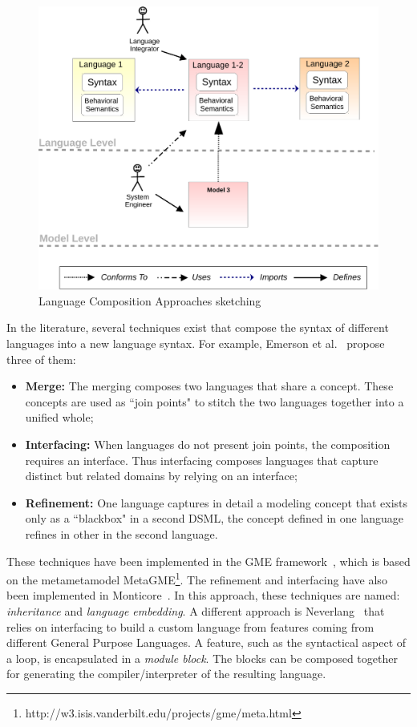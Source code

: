 \begin{figure}
	\begin{center}
		\includegraphics[width=.7\textwidth]{background/figs/langcompo}
		\caption{Language Composition Approaches sketching}
		\label{fig:langcompo}
	\end{center}
\end{figure}

In the literature, several techniques exist that compose the syntax of different languages into a new language syntax. For example, Emerson et al.~\cite{metamodelcompo} propose three of them:
\begin{itemize}
	\item \textbf{Merge:} The merging composes two languages that share a concept. These concepts are used as ``join points" to stitch the two languages together into a unified whole;
	\item \textbf{Interfacing:} When languages do not present join points, the composition requires an interface. Thus interfacing composes languages that capture distinct but related domains by relying on an interface;
	\item \textbf{Refinement:} One language captures in detail a modeling concept that exists only as a ``blackbox" in a second DSML, \ie the concept defined in one language refines in other in the second language.
\end{itemize}
These techniques have been implemented in the GME framework~\cite{metamodelcompo}, which is based on the metametamodel MetaGME\footnote{http://w3.isis.vanderbilt.edu/projects/gme/meta.html}. The refinement and interfacing have also been implemented in Monticore~\cite{monticore}. In this approach, these techniques are named: \emph{inheritance} and \emph{language embedding}. A different approach is Neverlang~\cite{neverlang} that relies on interfacing to build a custom language from features coming from different General Purpose Languages. A feature, such as the syntactical aspect of a loop, is encapsulated in a \emph{module block}. The blocks can be composed together for generating the compiler/interpreter of the resulting language. 

